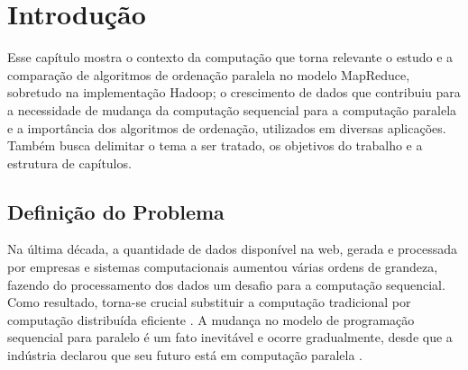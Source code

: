 \chapter{Introdução}
\label{cap:introducao}


Esse capítulo mostra o contexto da computação que torna relevante o estudo e a comparação de algoritmos de ordenação paralela no modelo MapReduce, sobretudo na implementação Hadoop; o crescimento de dados que contribuiu para a necessidade de mudança da computação sequencial para a computação paralela e a importância dos algoritmos de ordenação, utilizados em diversas aplicações. Também busca delimitar o tema a ser tratado, os objetivos do trabalho e a estrutura de capítulos.  


%


\section{Definição do Problema}

%
%

Na última década, a quantidade de dados  disponível na web, gerada e processada por empresas e sistemas computacionais aumentou várias ordens de grandeza, fazendo do processamento dos dados um desafio para a computação sequencial. Como resultado, torna-se crucial substituir a computação tradicional por computação distribuída eficiente \cite{Lin:2010}. A mudança no modelo de programação sequencial para paralelo é um fato inevitável e ocorre gradualmente, desde que a indústria declarou que seu futuro está em computação paralela \cite{Asanovic:2009}.

